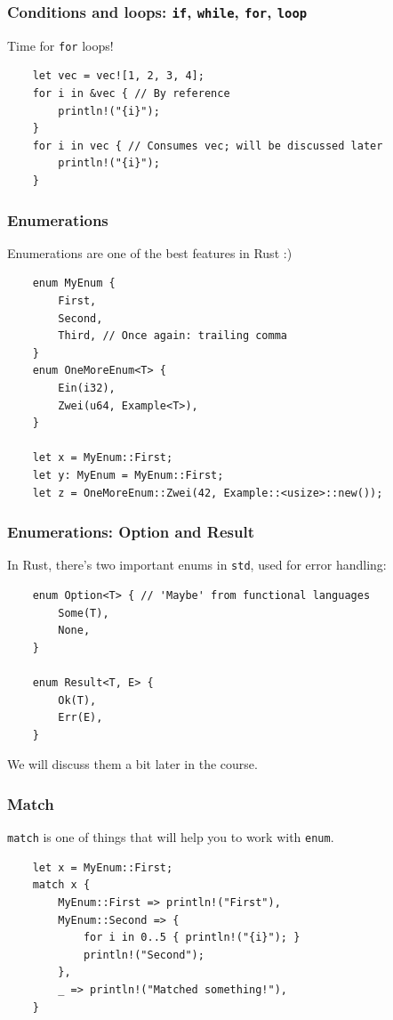 \documentclass[aspectratio=1610,t]{beamer}
\begin{document}

\begin{frame}[fragile]
\frametitle{Conditions and loops: \texttt{if}, \texttt{while}, \texttt{for}, \texttt{loop}}
Time for \texttt{for} loops!

\begin{verbatim}
    let vec = vec![1, 2, 3, 4];
    for i in &vec { // By reference
        println!("{i}");
    }
    for i in vec { // Consumes vec; will be discussed later
        println!("{i}");
    }
\end{verbatim}
\end{frame}


\begin{frame}[fragile]
\frametitle{Enumerations}
Enumerations are one of the best features in Rust :)

\begin{verbatim}
    enum MyEnum {
        First,
        Second,
        Third, // Once again: trailing comma
    }
    enum OneMoreEnum<T> {
        Ein(i32),
        Zwei(u64, Example<T>),
    }

    let x = MyEnum::First;
    let y: MyEnum = MyEnum::First;
    let z = OneMoreEnum::Zwei(42, Example::<usize>::new());
\end{verbatim}
\end{frame}


\begin{frame}[fragile]
\frametitle{Enumerations: Option and Result}
In Rust, there's two important enums in \texttt{std}, used for error handling:

\begin{verbatim}
    enum Option<T> { // 'Maybe' from functional languages
        Some(T),
        None,
    }

    enum Result<T, E> {
        Ok(T),
        Err(E),
    }
\end{verbatim}

We will discuss them a bit later in the course.
\end{frame}


\begin{frame}[fragile]
\frametitle{Match}
\texttt{match} is one of things that will help you to work with \texttt{enum}.

\begin{verbatim}
    let x = MyEnum::First;
    match x {
        MyEnum::First => println!("First"),
        MyEnum::Second => {
            for i in 0..5 { println!("{i}"); }
            println!("Second");
        },
        _ => println!("Matched something!"),
    }
\end{verbatim}
\end{frame}
\end{document}
